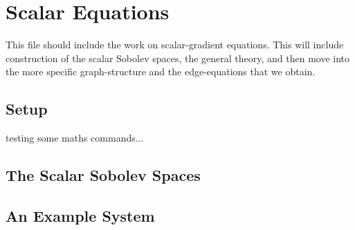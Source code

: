 \chapter{Scalar Equations}
This file should include the work on scalar-gradient equations. This will include construction of the scalar Sobolev spaces, the general theory, and then move into the more specific graph-structure and the edge-equations that we obtain.

\section{Setup}
testing some maths commands...


\section{The Scalar Sobolev Spaces}

\section{An Example System}